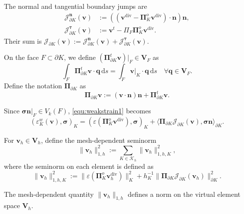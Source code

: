\documentclass[review,hidelinks,onefignum,onetabnum]{siamart251216}
\begin{document}
The normal and tangential boundary jumps are
\[
\begin{aligned}
\mathcal J_{\partial K}^{\boldsymbol n}(\boldsymbol v)
&:=((\boldsymbol v^{\operatorname{div}}-
\boldsymbol\Pi_K^o\boldsymbol v^{\operatorname{div}})\cdot\boldsymbol n)\boldsymbol n,\\
\mathcal J_{\partial K}^{\boldsymbol\tau}(\boldsymbol v)
&:=\boldsymbol v^t-\Pi_F\boldsymbol\Pi_K^o\boldsymbol v^{\operatorname{div}}.
\end{aligned}
\]
Their sum is $\mathcal J_{\partial K}(\boldsymbol v):=
\mathcal J_{\partial K}^{\boldsymbol n}(\boldsymbol v)+
\mathcal J_{\partial K}^{\boldsymbol\tau}(\boldsymbol v)$.

 On the face \(F \subset \partial K\), we define \((\boldsymbol{\Pi}_{\partial K}^t \boldsymbol{v})|_F \in \boldsymbol{V}_F\) as
\[
\int_F \boldsymbol{\Pi}_{\partial K}^t \boldsymbol{v} \cdot \boldsymbol{q}\,\mathrm ds = \int_F \boldsymbol{v}|_K \cdot \boldsymbol{q}\,\mathrm ds \quad \forall \boldsymbol{q} \in \boldsymbol{V}_F.
\]
Define the notation \(\boldsymbol{\Pi}_{\partial K}\) as
\[
\boldsymbol{\Pi}_{\partial K} \boldsymbol{v} := (\boldsymbol{v} \cdot \boldsymbol{n})\boldsymbol{n} + \boldsymbol{\Pi}_{\partial K}^t \boldsymbol{v}.
\]

Since $\boldsymbol\sigma\boldsymbol n|_F\in V_k(F)$, \eqref{equ:weakstrain1} becomes
\[
(\varepsilon_K^w(\boldsymbol{v}), \boldsymbol{\sigma})_K = (\varepsilon(\boldsymbol{\Pi}_K^o \boldsymbol{v}^{\operatorname{div}}), \boldsymbol{\sigma})_K + \langle \boldsymbol{\Pi}_{\partial K} \mathcal{J}_{\partial K}(\boldsymbol{v}), \boldsymbol{\sigma}\boldsymbol{n} \rangle_{\partial K}.
\]


For $\boldsymbol v_h\in\boldsymbol V_h$, define the mesh-dependent seminorm
\[
\|\boldsymbol{v}_h\|_{1,h}^2 := \sum_{K \in \mathcal{K}_h} \|\boldsymbol{v}_h\|_{1,h,K}^2,
\]
where the seminorm on each element is defined as
\[
\|\boldsymbol{v}_h\|_{1,h,K}^2 := \|\varepsilon (\boldsymbol{\Pi}_K^o \boldsymbol{v}_h^{\operatorname{div}})\|_K^2 + h_K^{-1}\|\boldsymbol{\Pi}_{\partial K}\mathcal{J}_{\partial K}(\boldsymbol{v}_h)\|_{\partial K}^2.
\]


\begin{lemma}\label{lem:norm}
The mesh-dependent quantity
\(
\|\boldsymbol{v}_h\|_{1,h}
\)
defines a norm on the virtual element space \(\boldsymbol{V}_h\).
\end{lemma}
\end{document}
